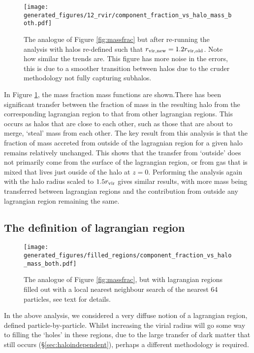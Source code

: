 \begin{figure}
    \centering
    \texttt{[image: generated\_figures/12\_rvir/component\_fraction\_vs\_halo\_mass\_both.pdf]}
    \caption{The analogue of Figure \ref{fig:massfrac} but after re-running
    the analysis with halos re-defined such that $r_{\rm vir, new} = 1.2
    r_{\rm vir, old}$. Note how similar the trends are. This figure has
    more noise in the errors, this is due to a smoother transition
    between halos due to the cruder methodology not fully capturing
    subhalos.}
    \label{fig:comparevirialradii}
\end{figure}
In Figure \ref{fig:comparevirialradii}, the mass fraction mass functions are
shown.There has been significant transfer between the fraction of mass in the
resulting halo from the corresponding lagrangian region to that from other
lagrangian regions. This occurs as halos that are close to each other, such as
those that are about to merge, `steal' mass from each other. The key result
from this analysis is that the fraction of mass accreted from outside of the
lagragnian region for a given halo remains relatively unchanged. This shows
that the transfer from `outside' does not primarily come from the surface of
the lagrangian region, or from gas that is mixed that lives just ouside of the
halo at $z=0$. Performing the analysis again with the halo radius scaled to
$1.5 r_{\rm vir}$ gives similar results, with more mass being transferred
between lagrangian regions and the contribution from outside any lagrangian
region remaining the same.

\subsection{The definition of lagrangian region}

\begin{figure}
    \centering
    \texttt{[image: generated\_figures/filled\_regions/component\_fraction\_vs\_halo\_mass\_both.pdf]}
    \caption{The analogue of Figure \ref{fig:massfrac}, but with lagrangian
	regions filled out with a local nearest neighbour search of the
	nearest 64 particles, see text for details.}
    \label{fig:filledlrmass}
\end{figure}

In the above analysis, we considered a very diffuse notion of a lagrangian
region, defined particle-by-particle. Whilst increasing the virial radius will
go some way to filling the `holes' in these regions, due to the large transfer
of dark matter that still occurs (\S \ref{sec:haloindependent}), perhaps a
different methodology is required.

